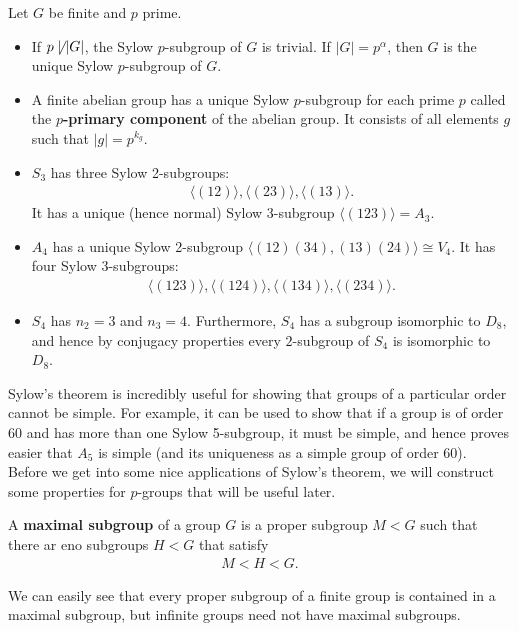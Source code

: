 \documentclass{memoir}
\begin{document}
\begin{exmp}
	Let \(G\) be finite and \(p\) prime.
	\begin{itemize}
		\item If \(p \not\mid \left| G \right| \), the Sylow \(p\)-subgroup of \(G\) is trivial. If \(\left| G \right| = p^{\alpha }\), then \(G\) is the unique Sylow \(p\)-subgroup of \(G\).
		\item A finite abelian group has a unique Sylow \(p\)-subgroup for each prime \(p\) called the \textbf{\(p\)-primary component} of the abelian group. It consists of all elements \(g\) such that \(\left| g \right| = p^{k_g}\).
		\item \(S_3\) has three Sylow 2-subgroups:
			\begin{align*}
				\langle (12) \rangle , \langle (23) \rangle , \langle (13) \rangle .
			\end{align*}
			It has a unique (hence normal) Sylow 3-subgroup \(\langle (123) \rangle = A_3\).
		\item \(A_4\) has a unique Sylow 2-subgroup \(\langle (12)(34),(13)(24) \rangle \cong V_4\). It has four Sylow 3-subgroups:
			\begin{align*}
				\langle (123) \rangle , \langle (124) \rangle , \langle (134) \rangle , \langle (234) \rangle .
			\end{align*}
		\item \(S_4\) has  \(n_2 = 3\) and \(n_3 = 4\). Furthermore, \(S_4\) has a subgroup isomorphic to \(D_{8}\), and hence by conjugacy properties every \(2\)-subgroup of \(S_4\) is isomorphic to \(D_8\).
	\end{itemize}
\end{exmp}

Sylow's theorem is incredibly useful for showing that groups of a particular order cannot be simple. For example, it can be used to show that if a group is of order 60 and has more than one Sylow 5-subgroup, it must be simple, and hence proves easier that \(A_5\) is simple (and its uniqueness as a simple group of order 60).\\

Before we get into some nice applications of Sylow's theorem, we will construct some properties for \(p\)-groups that will be useful later.

\begin{defn}
	A \textbf{maximal subgroup} of a group \(G\) is a proper subgroup \(M<G\) such that there ar eno subgroups \(H<G\) that satisfy
	\begin{align*}
		M < H < G.
	\end{align*}
\end{defn}
We can easily see that every proper subgroup of a finite group is contained in a maximal subgroup, but infinite groups need not have maximal subgroups.
\end{document}
